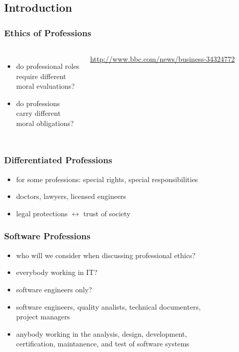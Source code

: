 \documentclass[dvipsnames]{beamer}
\theoremstyle{plain}
\begin{document}
\subsection{Introduction}

\begin{frame}
  \frametitle{Ethics of Professions}

  \begin{columns}
    \begin{itemize}
      \item do professional roles\\
        require different\\
        moral evaluations?
      \item do professions\\
        carry different\\
        moral obligations?
    \end{itemize}


    \medskip
    \tiny{\url{http://www.bbc.com/news/business-34324772}}
  \end{columns}
\end{frame}

\begin{frame}
  \frametitle{Differentiated Professions}

  \begin{itemize}
    \item for some professions: special rights, special responsibilities

    \medskip
    \item doctors, lawyers, licensed engineers
    \item legal protections $\leftrightarrow$ trust of society
  \end{itemize}
\end{frame}

\begin{frame}
  \frametitle{Software Professions}

  \begin{itemize}
    \item who will we consider when discussing professional ethics?
    \item everybody working in IT?
    \item software engineers only?

    \pause
    \medskip
    \item software engineers, quality analists, technical documenters,\\
      project managers
    \item anybody working in the analysis, design, development,\\
      certification, maintanence, and test of software systems
  \end{itemize}
\end{frame}
\end{document}
